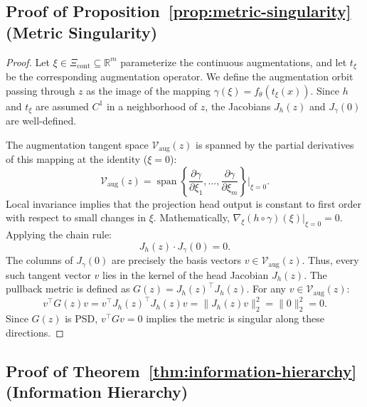 \documentclass{article}
\theoremstyle{plain}
\theoremstyle{definition}
\theoremstyle{remark}
\begin{document}
\subsection{Proof of Proposition~\ref{prop:metric-singularity} (Metric Singularity)}

\begin{proof}
Let $\xi \in \Xi_{\text{cont}} \subseteq \mathbb{R}^m$ parameterize the continuous augmentations, and let $t_\xi$ be the corresponding augmentation operator. We define the augmentation orbit passing through $z$ as the image of the mapping $\gamma(\xi) = f_\theta(t_\xi(x))$. Since $h$ and $t_\xi$ are assumed $C^1$ in a neighborhood of $z$, the Jacobians $J_h(z)$ and $J_\gamma(0)$ are well-defined.

The augmentation tangent space $\mathcal{V}_{\text{aug}}(z)$ is spanned by the partial derivatives of this mapping at the identity ($\xi=0$):
\begin{equation*}
    \mathcal{V}_{\text{aug}}(z) = \operatorname{span} \left\{ \frac{\partial \gamma}{\partial \xi_1}, \dots, \frac{\partial \gamma}{\partial \xi_m} \right\} \Bigg|_{\xi=0}.
\end{equation*}
Local invariance implies that the projection head output is constant to first order with respect to small changes in $\xi$. Mathematically, $\nabla_\xi (h \circ \gamma)(\xi) |_{\xi=0} = 0$.
Applying the chain rule:
\begin{equation*}
    J_h(z) \cdot J_\gamma(0) = 0.
\end{equation*}
The columns of $J_\gamma(0)$ are precisely the basis vectors $v \in \mathcal{V}_{\text{aug}}(z)$. Thus, every such tangent vector $v$ lies in the kernel of the head Jacobian $J_h(z)$.
The pullback metric is defined as $G(z) = J_h(z)^\top J_h(z)$. For any $v \in \mathcal{V}_{\text{aug}}(z)$:
\begin{equation*}
    v^\top G(z) v = v^\top J_h(z)^\top J_h(z) v = \| J_h(z) v \|^2_2 = \| 0 \|^2_2 = 0.
\end{equation*}
Since $G(z)$ is PSD, $v^\top G v = 0$ implies the metric is singular along these directions.
\end{proof} 

\subsection{Proof of Theorem~\ref{thm:information-hierarchy} (Information Hierarchy)}
\end{document}

